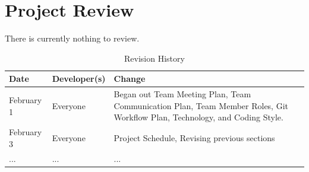 \documentclass{article}
\begin{document}
\clearpage

\section{Project Review}

There is currently nothing to review.

\newpage

\begin{table}[hp]
\caption{Revision History} \label{TblRevisionHistory}
\begin{tabularx}{\textwidth}{llX}
\toprule
\textbf{Date} & \textbf{Developer(s)} & \textbf{Change}\\
\midrule
February 1 & Everyone & Began out Team Meeting Plan, Team Communication Plan, Team Member Roles, Git Workflow Plan, Technology, and Coding Style. \\
February 3 & Everyone & Project Schedule, Revising previous sections\\ 
... & ... & ...\\
\bottomrule
\end{tabularx}
\end{table}
\end{document}
